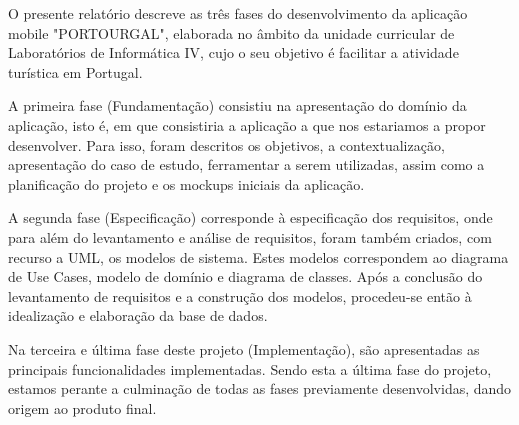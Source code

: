 \par O presente relatório descreve as três fases do desenvolvimento da aplicação mobile "PORTOURGAL", elaborada no âmbito da unidade curricular de Laboratórios de Informática IV, cujo o seu objetivo é facilitar a atividade turística em Portugal.
\par A primeira fase (Fundamentação) consistiu na apresentação do domínio da aplicação, isto é, em que consistiria a aplicação a que nos estariamos a propor desenvolver. Para isso, foram descritos os objetivos, a contextualização, apresentação do caso de estudo, ferramentar a serem utilizadas, assim como a planificação do projeto e os mockups iniciais da aplicação.
\par A segunda fase (Especificação) corresponde à especificação dos requisitos, onde para além do levantamento e análise de requisitos, foram também criados, com recurso a UML, os modelos de sistema.
Estes modelos correspondem ao diagrama de Use Cases, modelo de domínio e diagrama de classes. Após a conclusão do levantamento de requisitos e a construção dos modelos, procedeu-se então à idealização e elaboração da base de dados.
\par Na terceira e última fase deste projeto (Implementação), são apresentadas as principais funcionalidades implementadas. Sendo esta a última fase do projeto, estamos perante a culminação de todas as fases previamente desenvolvidas, dando origem ao produto final.